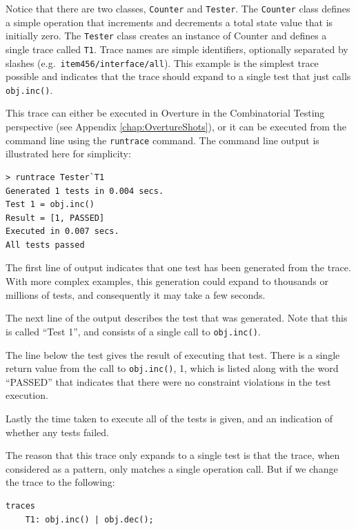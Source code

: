 \documentclass{overturerepchap}
\begin{document}
Notice that there are two classes, \texttt{Counter} and \texttt{Tester}. The \texttt{Counter} class defines a
simple operation that increments and decrements a total state value that is
initially zero. The \texttt{Tester} class creates an instance of Counter and defines a
single trace called \texttt{T1}. Trace names are simple identifiers, optionally separated
by slashes (e.g.\ \texttt{item456/interface/all}). This example is the simplest
trace possible and indicates that the trace should expand to a single test that
just calls \texttt{obj.inc()}.

This trace can either be executed in Overture in the Combinatorial Testing
perspective (see Appendix \ref{chap:OvertureShots}), or it can be executed from
the command line using the \texttt{runtrace} command. The command line output is
illustrated here for simplicity:

\lstset{style=tool,language=}
\begin{lstlisting}[escapechar=@]
> runtrace Tester`T1
Generated 1 tests in 0.004 secs. 
Test 1 = obj.inc()
Result = [1, PASSED]
Executed in 0.007 secs. 
All tests passed
\end{lstlisting}
\lstset{style=mystyle}
\lstset{language=VDM++}

The first line of output indicates that one test has been generated from the
trace. With more complex examples, this generation could expand to thousands or
millions of tests, and consequently it may take a few seconds.

The next line of the output describes the test that was generated. Note that
this is called ``Test 1'', and consists of a single call to \texttt{obj.inc()}.

The line below the test gives the result of executing that test. There is a
single return value from the call to \texttt{obj.inc()}, 1, which is listed
along with the word ``PASSED'' that indicates that there were no constraint violations
in the test execution.

Lastly the time taken to execute all of the tests is given, and an indication of
whether any tests failed.

The reason that this trace only expands to a single test is that the trace, when
considered as a pattern, only matches a single operation call. But if we change
the trace to the following:

\small
\begin{lstlisting}
traces
    T1: obj.inc() | obj.dec();
\end{lstlisting}
\normalsize
\end{document}
